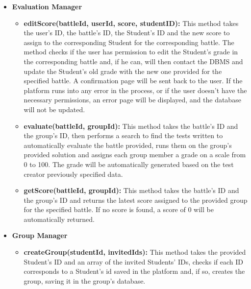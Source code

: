 \documentclass{article}
\begin{document}
{\begin{itemize}
\begin{itemize}
        \item \textbf{sendRegistrationNot(userId):} This method is called after a user's registration procedure is completed. Once the user's data is saved 
        in the user's database, an e-mail, containing a confirmation message for the registration procedure is sent to the user.
        This is achieved using external Notification APIs.  
    \end{itemize}
    \item \textbf{Evaluation Manager}
    \begin{itemize}
        \item \textbf{editScore(battleId, userId, score, studentID):} This method takes the user's ID, the battle's ID, the Student's ID and the new score to assign to the 
        corresponding Student for the corresponding battle. The method checks if the user has permission to edit the Student's grade in the corresponding battle and, 
        if he can, will then contact the DBMS and update the Student's old grade with the new one provided for the specified battle. 
        A confirmation page will be sent back to the user.
        If the platform runs into any error in the process, or if the user doesn't have the necessary permissions, an error page will be displayed, and the database will not be
        updated.
        \item \textbf{evaluate(battleId, groupId):} This method takes the battle's ID and the group's ID, then performs a search to find the tests written to automatically
        evaluate the battle provided, runs them on the group's provided solution and assigns each group member a grade on a scale from 0 to 100.
        The grade will be automatically generated based on the test creator previously specified data.
        \item \textbf{getScore(battleId, groupId):}  This method takes the battle's ID and the group's ID and returns the latest score assigned to the provided group for the 
        specified battle. If no score is found, a score of 0 will be automatically returned.
    \end{itemize}
    \item \textbf{Group Manager}
    \begin{itemize}
        \item \textbf{createGroup(studentId, invitedIds):} This method takes the provided Student's ID and an array of the invited Students' IDs,
        checks if each ID corresponds to a Student's id saved in the platform and, if so, creates the group, saving it in the group's database.  
    \end{itemize}
\end{itemize}
}
\end{document}
